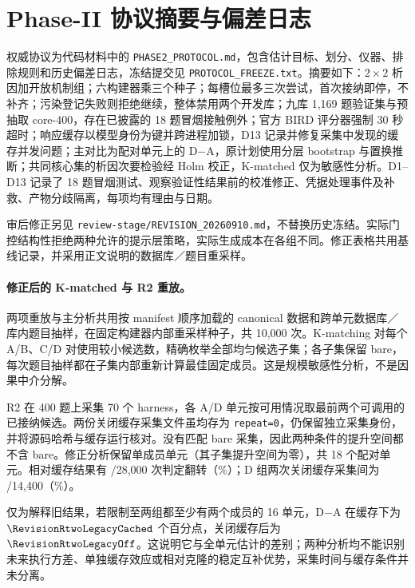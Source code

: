 \section{Phase-II 协议摘要与偏差日志}\label{app:phase2-protocol}
权威协议为代码材料中的 \texttt{PHASE2\_PROTOCOL.md}，包含估计目标、划分、仪器、排除规则和历史偏差日志，冻结提交见 \texttt{PROTOCOL\_FREEZE.txt}。摘要如下：$2\times2$ 析因加开放机制组；六构建器乘三个种子；每槽位最多三次尝试，首次接纳即停，不补齐；污染登记失败则拒绝继续，整体禁用两个开发库；九库 1,169 题验证集与预抽取 core-400，存在已披露的 18 题冒烟接触例外；官方 BIRD 评分器强制 30 秒超时；响应缓存以模型身份为键并跨进程加锁，D13 记录并修复采集中发现的缓存并发问题；主对比为配对单元上的 D$-$A，原计划使用分层 bootstrap 与置换推断；共同核心集的析因次要检验经 Holm 校正，K-matched 仅为敏感性分析。D1--D13 记录了 18 题冒烟测试、观察验证性结果前的校准修正、凭据处理事件及补救、产物分歧隔离，每项均有理由与日期。

审后修正另见 \texttt{review-stage/REVISION\_20260910.md}，不替换历史冻结。实际门控结构性拒绝两种允许的提示层策略，实际生成成本在各组不同。修正表格共用基线记录，并采用正文说明的数据库／题目重采样。
\paragraph{修正后的 K-matched 与 R2 重放。}\label{app:r2}
两项重放与主分析共用按 manifest 顺序加载的 canonical 数据和跨单元数据库／库内题目抽样，在固定构建器内部重采样种子，共 10,000 次。K-matching 对每个 A/B、C/D 对使用较小候选数，精确枚举全部均匀候选子集；各子集保留 bare，每次题目抽样都在子集内部重新计算最佳固定成员。这是规模敏感性分析，不是因果中介分解。

R2 在 400 题上采集 70 个 harness，各 A/D 单元按可用情况取最前两个可调用的已接纳候选。两份关闭缓存采集文件虽均存为 \texttt{repeat=0}，仍保留独立采集身份，并将源码哈希与缓存运行核对。没有匹配 bare 采集，因此两种条件的提升空间都不含 bare。修正分析保留单成员单元（其子集提升空间为零），共 18 个配对单元。相对缓存结果有 \RevisionRtwoFlips/28,000 次判定翻转（\RevisionRtwoFlipPercent\%）；D 组两次关闭缓存采集间为 \RevisionRtwoRepeatFlips/14,400（\RevisionRtwoRepeatPercent\%）。

仅为解释旧结果，若限制至两组都至少有两个成员的 16 单元，D$-$A 在缓存下为 $\RevisionRtwoLegacyCached$ 个百分点，关闭缓存后为 $\RevisionRtwoLegacyOff$。这说明它与全单元估计的差别；两种分析均不能识别未来执行方差、单独缓存效应或相对克隆的稳定互补优势，采集时间与缓存条件并未分离。
\begin{table}[t]\centering\small

\caption{core-400、18 单元的修正敏感性结果，CI 未校正。K-matched 始终保留 bare；R2 排除 bare，并以已观察采集组为条件。}\label{tab:sensitivity}
\end{table}
